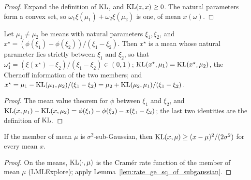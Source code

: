 \begin{proof}
  \leanok
  Expand the definition of $\mathrm{KL}$, and $\mathrm{KL}(z, x) \ge 0$. The natural parameters form a convex set,
  so $\omega_1 \xi(\mu_1) + \omega_2 \xi(\mu_2)$ is one, of mean $x(\omega)$.
\end{proof}

\begin{lemma}
  \label{lem:chernoff_point}
  \leanok
  Let $\mu_1 \ne \mu_2$ be means with natural parameters $\xi_1, \xi_2$, and
  $x^{\star} = (\phi(\xi_1) - \phi(\xi_2)) / (\xi_1 - \xi_2)$. Then $x^{\star}$ is a mean whose
  natural parameter lies strictly between $\xi_1$ and $\xi_2$, so that
  $\omega^{\star}_1 = (\xi(x^{\star}) - \xi_2) / (\xi_1 - \xi_2) \in (0, 1)$;
  $\mathrm{KL}(x^{\star}, \mu_1) = \mathrm{KL}(x^{\star}, \mu_2)$, the Chernoff information of the two members; and
  $x^{\star} = \mu_1 - \mathrm{KL}(\mu_1, \mu_2) / (\xi_1 - \xi_2) = \mu_2 + \mathrm{KL}(\mu_2, \mu_1) / (\xi_1 -
  \xi_2)$.
\end{lemma}

\begin{proof}
  \leanok
  The mean value theorem for $\phi$ between $\xi_1$ and $\xi_2$, and
  $\mathrm{KL}(x, \mu_1) - \mathrm{KL}(x, \mu_2) = \phi(\xi_1) - \phi(\xi_2) - x (\xi_1 - \xi_2)$; the last two
  identities are the definition of $\mathrm{KL}$.
\end{proof}

\begin{lemma}
  \label{lem:expFamilyDiv_ge_sq_of_subgaussian}
  \leanok
  If the member of mean $\mu$ is $\sigma^2$-sub-Gaussian, then $\mathrm{KL}(x, \mu) \ge (x - \mu)^2 / (2
  \sigma^2)$ for every mean $x$.
\end{lemma}

\begin{proof}
  \leanok
  On the means, $\mathrm{KL}(\cdot, \mu)$ is the Cramér rate function of the member of mean $\mu$
  (LMLExplore); apply Lemma~\ref{lem:rate_ge_sq_of_subgaussian}.
\end{proof}

